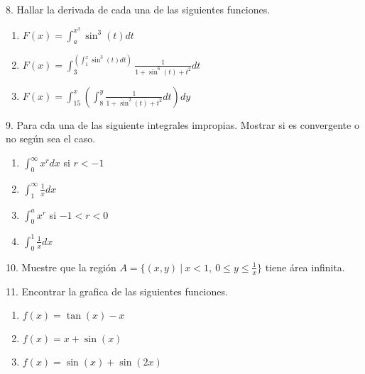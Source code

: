 \documentclass[12pt]{article}
\begin{document}
8. Hallar la derivada de cada una de las siguientes funciones.

\begin{enumerate}[\hspace{9px} a)]
    \item \(F(x)=\displaystyle\int_{a}^{x^3}\sin^3(t)dt\)
    
    \item \(F(x)=\displaystyle\int_{3}^{\left(\displaystyle\int_{1}^{x}\sin^3(t)dt\right)}\frac{1}{1+\sin^6(t)+t^2}dt\)
    
    \item \(F(x)=\displaystyle\int_{15}^{x}\left(\int_{8}^{y}\frac{1}{1+\sin^2(t)+t^2}dt\right)dy\)

\end{enumerate}

9. Para cda una de las siguiente integrales impropias. Mostrar si es convergente o no seg\'un sea el caso.

\begin{enumerate}[\hspace{9px} a)]
    \item \(\displaystyle\int_{0}^{\infty}x^rdx\) si $r<-1$
    
    \item \(\displaystyle\int_{1}^{\infty}\frac{1}{x}dx\)
    
    \item \(\displaystyle\int_{0}^{a}x^r\) si $-1<r<0$
    
    \item \(\displaystyle\int_{0}^{1}\frac{1}{x}dx\)

\end{enumerate}

10. Muestre que la regi\'on \(A=\{(x,y) \ | \ x<1, \ 0 \leq y \leq \frac{1}{x}\}\) tiene \'area infinita.

11. Encontrar la gr\;afica de las siguientes funciones.

\begin{enumerate}[\hspace{9px} a)]
    \item \(f(x)=\tan(x)-x\)
    
    \item \(f(x)=x+\sin(x)\)
    
    \item \(f(x)=\sin(x)+\sin(2x)\)

\end{enumerate}
\end{document}
